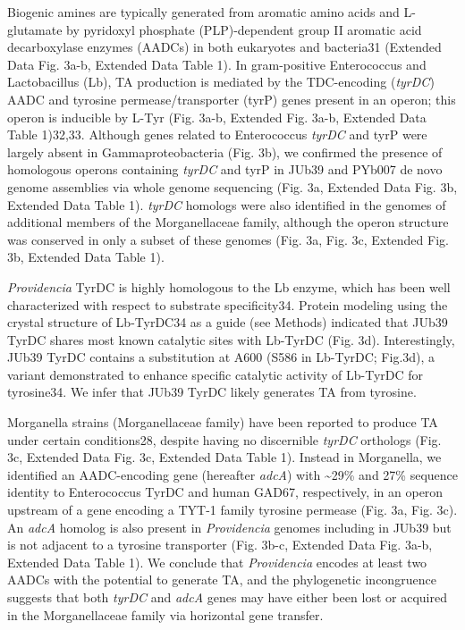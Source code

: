 \documentclass[]{article}
\begin{document}
Biogenic amines are typically generated from aromatic amino acids and
L-glutamate by pyridoxyl phosphate (PLP)-dependent group II aromatic
acid decarboxylase enzymes (AADCs) in both eukaryotes and bacteria31
(Extended Data Fig. 3a-b, Extended Data Table 1). In gram-positive
Enterococcus and Lactobacillus (Lb), TA production is mediated by the
TDC-encoding (\textit{tyrDC}) AADC and tyrosine permease/transporter
(tyrP) genes present in an operon; this operon is inducible by L-Tyr
(Fig. 3a-b, Extended Fig. 3a-b, Extended Data Table 1)32,33. Although
genes related to Enterococcus \textit{tyrDC} and tyrP were largely
absent in Gammaproteobacteria (Fig. 3b), we confirmed the presence of
homologous operons containing \textit{tyrDC} and tyrP in JUb39 and
PYb007 de novo genome assemblies via whole genome sequencing (Fig. 3a,
Extended Data Fig. 3b, Extended Data Table 1). \textit{tyrDC} homologs
were also identified in the genomes of additional members of the
Morganellaceae family, although the operon structure was conserved in
only a subset of these genomes (Fig. 3a, Fig. 3c, Extended Fig. 3b,
Extended Data Table 1).

\textit{Providencia} TyrDC is highly homologous to the Lb enzyme, which
has been well characterized with respect to substrate specificity34.
Protein modeling using the crystal structure of Lb-TyrDC34 as a guide
(see Methods) indicated that JUb39 TyrDC shares most known catalytic
sites with Lb-TyrDC (Fig. 3d). Interestingly, JUb39 TyrDC contains a
substitution at A600 (S586 in Lb-TyrDC; Fig.3d), a variant demonstrated
to enhance specific catalytic activity of Lb-TyrDC for tyrosine34. We
infer that JUb39 TyrDC likely generates TA from tyrosine.

Morganella strains (Morganellaceae family) have been reported to produce
TA under certain conditions28, despite having no discernible
\textit{tyrDC} orthologs (Fig. 3c, Extended Data Fig. 3c, Extended Data
Table 1). Instead in Morganella, we identified an AADC-encoding gene
(hereafter \textit{adcA}) with \textasciitilde{}29\% and 27\% sequence
identity to Enterococcus TyrDC and human GAD67, respectively, in an
operon upstream of a gene encoding a TYT-1 family tyrosine permease
(Fig. 3a, Fig. 3c). An \textit{adcA} homolog is also present in
\textit{Providencia} genomes including in JUb39 but is not adjacent to a
tyrosine transporter (Fig. 3b-c, Extended Data Fig. 3a-b, Extended Data
Table 1). We conclude that \textit{Providencia} encodes at least two
AADCs with the potential to generate TA, and the phylogenetic
incongruence suggests that both \textit{tyrDC} and \textit{adcA} genes
may have either been lost or acquired in the Morganellaceae family via
horizontal gene transfer.
\end{document}
